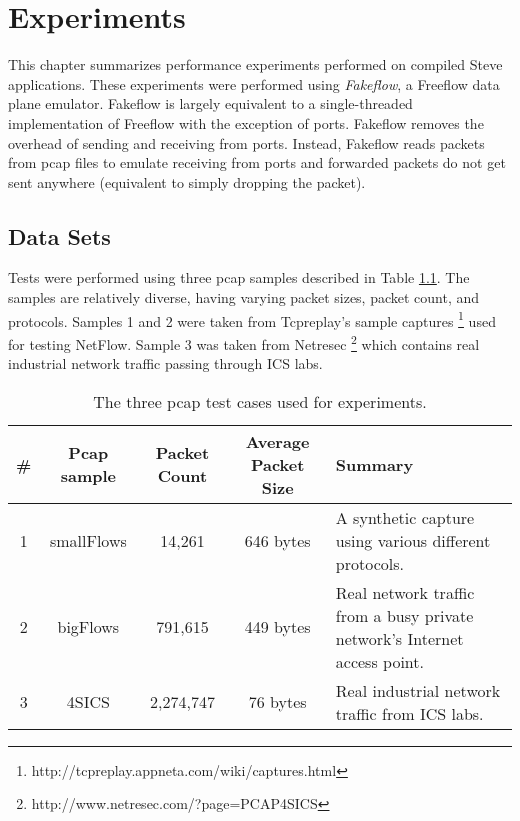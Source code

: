 \chapter{Experiments} \label{ch:experiments}

This chapter summarizes performance experiments performed on compiled Steve applications. These experiments were performed using \textit{Fakeflow}, a Freeflow data plane emulator. Fakeflow is largely equivalent to a single-threaded implementation of Freeflow with the exception of ports. Fakeflow removes the overhead of sending and receiving from ports. Instead, Fakeflow reads packets from pcap files to emulate receiving from ports and forwarded packets do not get sent anywhere (equivalent to simply dropping the packet).

\section{Data Sets} \label{exp:use_cases}

Tests were performed using three pcap samples described in Table \ref{tbl:pcap}. 
The samples are relatively diverse, having varying packet sizes, packet count, and protocols. Samples 1 and 2 were taken from Tcpreplay's sample captures \footnote{http://tcpreplay.appneta.com/wiki/captures.html} used for testing NetFlow. Sample 3 was taken from Netresec \footnote{http://www.netresec.com/?page=PCAP4SICS} which contains real industrial network traffic passing through ICS labs.

\begin{table}
\caption{The three pcap test cases used for experiments.}
\begin{center}
\begin{tabularx}{\linewidth}{| c || c | c | c | X |}
\hline
\# & Pcap sample & Packet Count & Average Packet Size & Summary \\
\hline
1 & smallFlows & 14,261 & 646 bytes & A synthetic capture using various different protocols. \\
\hline
2 & bigFlows & 791,615 & 449 bytes & Real network traffic from a busy private network's Internet access point. \\
\hline
3 & 4SICS & 2,274,747 & 76 bytes & Real industrial network traffic from ICS labs. \\
\hline
\end{tabularx}
\end{center}
\label{tbl:pcap}
\end{table}


